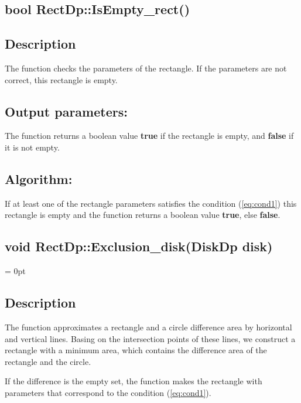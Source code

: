 \documentclass{report}
\begin{document}
\label{Empty}
\begin{center} 
	\section*{\bfseries bool RectDp::IsEmpty\_rect()}
\end{center} 

\subsection*{Description}

The function checks the parameters of the rectangle. If the parameters are not correct, this rectangle is empty. 

\subsection*{Output parameters:}

The function returns a boolean value {\bfseries true} if the rectangle is empty, and {\bfseries false} if it is not empty.

\subsection*{Algorithm:}

If at least one of the rectangle parameters satisfies the condition  (\ref{eq:cond1}) this rectangle is empty and the function returns a boolean value {\bfseries true}, else  {\bfseries false}.

\label{Difference}
\begin{center} 
	\section*{void RectDp::Exclusion\_disk(DiskDp disk)}
\end{center}
\parindent = 0pt
\subsection*{Description}

The function approximates a rectangle and a circle difference area by horizontal and vertical lines. Basing on the intersection points of these lines, we construct a rectangle with a minimum area, which contains the difference area of the rectangle and the circle.

If the difference is the empty set, the function makes the rectangle with parameters that correspond to the condition (\ref{eq:cond1}).
\end{document}
